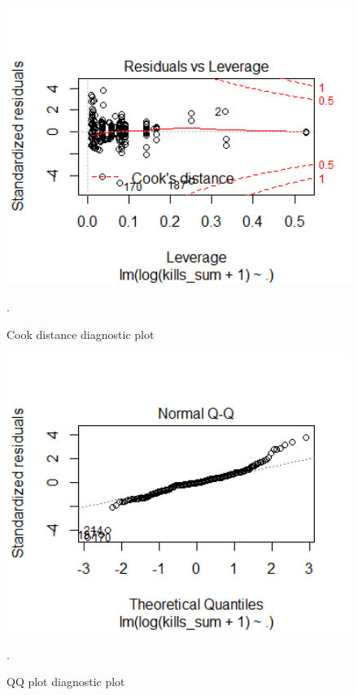 \begin{figure}[t]
\includegraphics[width=15cm]{Peters_experiment_markdown_files/figure-latex/Rplot02_cooksdistance.png}
\caption{Cook distance diagnostic plot}.
\label{fig:cookdistdiag}
\centering
\end{figure}

\begin{figure}[t]
\includegraphics[width=15cm]{Peters_experiment_markdown_files/figure-latex/Rplot02_qqplot.png}
\caption{QQ plot diagnostic plot}.
\label{fig:qqplotdiag}
\centering
\end{figure}


